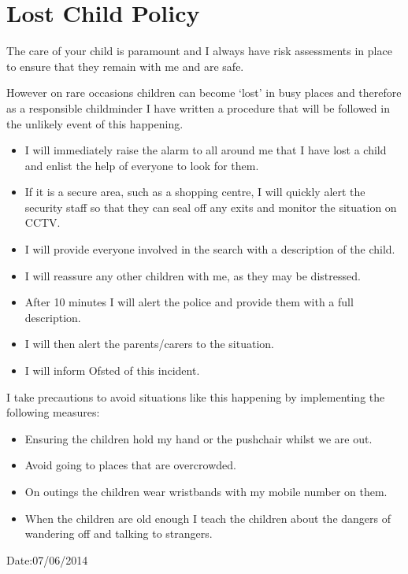 \documentclass[10pt]{article}
\begin{document}
\section{Lost Child Policy}

The care of your child is paramount and I always have risk assessments
in place to ensure that they remain with me and are safe.

However on rare occasions children can become `lost' in busy places and
therefore as a responsible childminder I have written a procedure that
will be followed in the unlikely event of this happening.

\begin{itemize}
\item
  I will immediately raise the alarm to all around me that I have lost
  a child and enlist the help of everyone to look for them.
\item
  If it is a secure area, such as a shopping centre, I will quickly
  alert the security staff so that they can seal off any exits and
  monitor the situation on CCTV.
\item
  I will provide everyone involved in the search with a description of
  the child.
\item
  I will reassure any other children with me, as they may be
  distressed.
\item
  After 10 minutes I will alert the police and provide them with a
  full description.
\item
  I will then alert the parents/carers to the situation.
\item
  I will inform Ofsted of this incident.
\end{itemize}

I take precautions to avoid situations like this happening by
implementing the following measures:

\begin{itemize}
\item
  Ensuring the children hold my hand or the pushchair whilst we are
  out.
\item
  Avoid going to places that are overcrowded.
\item
  On outings the children wear wristbands with my mobile number on
  them.
\item
  When the children are old enough I teach the children about the
  dangers of wandering off and talking to strangers.
\end{itemize}

Date:07/06/2014

~
\end{document}

